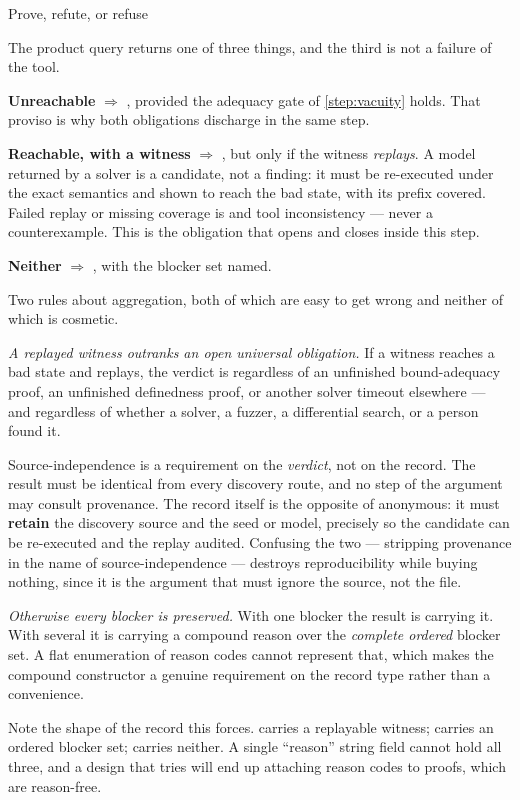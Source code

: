 \begin{step}{Prove, refute, or refuse}{%
}
\label{step:verdict}

The product query returns one of three things, and the third is not a failure of
the tool.

\textbf{Unreachable} $\Rightarrow$ \Proved{}, provided the adequacy gate of
\cref{step:vacuity} holds. That proviso is why both obligations discharge in the
same step.

\textbf{Reachable, with a witness} $\Rightarrow$ \Ctrex{}, but only if the
witness \emph{replays}. A model returned by a solver is a candidate, not a
finding: it must be re-executed under the exact semantics and shown to reach the
bad state, with its prefix covered. Failed replay or missing coverage is
\Unknown{} and tool inconsistency --- never a counterexample. This is the
obligation that opens and closes inside this step.

\textbf{Neither} $\Rightarrow$ \Unknown{}, with the blocker set named.

Two rules about aggregation, both of which are easy to get wrong and neither of
which is cosmetic.

\emph{A replayed witness outranks an open universal obligation.} If a witness
reaches a bad state and replays, the verdict is \Ctrex{} regardless of an
unfinished bound-adequacy proof, an unfinished definedness proof, or another
solver timeout elsewhere --- and regardless of whether a solver, a fuzzer, a
differential search, or a person found it.

Source-independence is a requirement on the \emph{verdict}, not on the record.
The result must be identical from every discovery route, and no step of the
argument may consult provenance. The record itself is the opposite of anonymous:
it must \textbf{retain} the discovery source and the seed or model, precisely so
the candidate can be re-executed and the replay audited. Confusing the two ---
stripping provenance in the name of source-independence --- destroys
reproducibility while buying nothing, since it is the argument that must ignore
the source, not the file.

\emph{Otherwise every blocker is preserved.} With one blocker the result is
\Unknown{} carrying it. With several it is \Unknown{} carrying a compound reason
over the \emph{complete ordered} blocker set. A flat enumeration of reason codes
cannot represent that, which makes the compound constructor a genuine
requirement on the record type rather than a convenience.

\begin{remark}
Note the shape of the record this forces. \Unsafe{} carries a replayable
witness; \Unknown{} carries an ordered blocker set; \Proved{} carries neither.
A single ``reason'' string field cannot hold all three, and a design that tries
will end up attaching reason codes to proofs, which are reason-free.
\end{remark}
\end{step}

